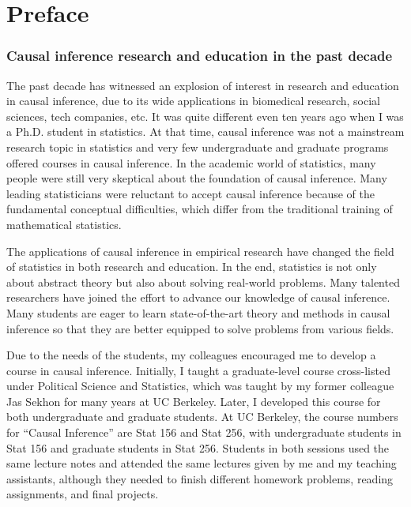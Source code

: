\chapter*{Preface}




\subsection*{Causal inference research and education in the past decade}



The past decade has witnessed an explosion of interest in research and education in causal inference, due to its wide applications in biomedical research, social sciences, tech companies, etc. It was quite different even ten years ago when I was a Ph.D. student in statistics. At that time, causal inference was not a mainstream research topic in statistics and very few undergraduate and graduate programs offered courses in causal inference.  In the academic world of statistics, many people were still very skeptical about the foundation of causal inference.  Many leading statisticians were reluctant to accept causal inference because of the fundamental conceptual difficulties, which differ from the traditional training of mathematical statistics. 


The applications of causal inference in empirical research have changed the field of statistics in both research and education. In the end, statistics is not only about abstract theory but also about solving real-world problems.  Many talented researchers have joined the effort to advance our knowledge of causal inference.  Many students are eager to learn state-of-the-art theory and methods in causal inference so that they are better equipped to solve problems from various fields. 



Due to the needs of the students, my colleagues encouraged me to develop a course in causal inference. Initially, I taught a graduate-level course cross-listed under Political Science and Statistics, which was taught by my former colleague Jas Sekhon for many years at UC Berkeley. Later, I developed this course for both undergraduate and graduate students. At UC Berkeley, the course numbers for ``Causal Inference'' are Stat 156 and Stat 256, with undergraduate students in Stat 156 and graduate students in Stat 256.  Students in both sessions used the same lecture notes and attended the same lectures given by me and my teaching assistants, although they needed to finish different homework problems, reading assignments, and final projects.  


